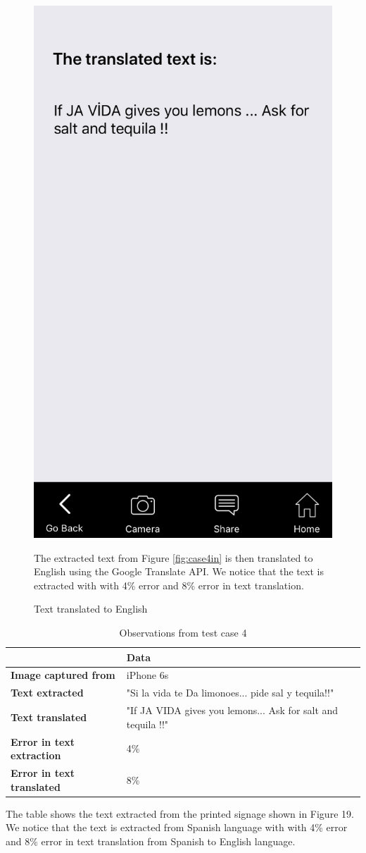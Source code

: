 \documentclass[12pt]{article}
\begin{document}
       \begin{figure}[H]
	\centering
	\includegraphics[width=0.5\linewidth]{media/case4b.png}
	\caption{Text translated to English}{The extracted text from Figure \ref{fig:case4in} is then translated to English using the Google Translate API. We notice that the text is extracted with with 4\% error and 8\% error in text translation.}
	\label{fig:engs}
\end{figure} 

\begin{table}%
    \centering
   
    \label{my-label4}
       \begin{tabular}{|p{30mm}|p{55mm}|p{35mm}|}
 \hline
  & \textbf{Data}  \\ [0.5ex] 
 \hline\hline
 \textbf{Image captured from} & iPhone 6s \\
 \hline
  \textbf{Text extracted} & "Si la vida te Da limonoes... pide sal y tequila!!"  \\
 \hline
 \textbf{Text translated} & "If JA VIDA gives you lemons... Ask for salt and tequila !!"   \\
 \hline
 \textbf{Error in text extraction} & 4\%   \\
 \hline
 \textbf{Error in text translated} & 8\%   \\ [1ex] 
 \hline
    \end{tabular}
     \caption{Observations from test case 4} {The table shows the text extracted from the printed signage shown in Figure 19. We notice that the text is extracted from Spanish language with with 4\% error and 8\% error in text translation from Spanish to English language.}
\end{table}
\end{document}
